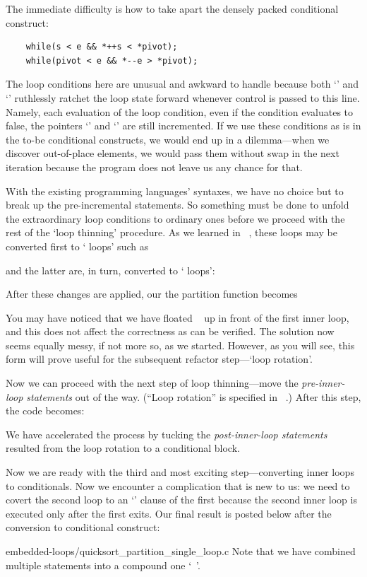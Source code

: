 The immediate difficulty is how to take apart the densely packed conditional construct:
\begin{lstlisting}
    while(s < e && *++s < *pivot);
    while(pivot < e && *--e > *pivot);
\end{lstlisting}
The loop conditions here are unusual and awkward to handle
because both `' and `' ruthlessly ratchet the loop state forward
whenever control is passed to this line.
Namely, each evaluation of the loop condition, even if the condition evaluates to false, the
pointers `' and `' are still incremented.
If we use these conditions as is in the to-be conditional constructs, we would end up in a
dilemma---when we discover out-of-place elements, we would pass them without swap in the next
iteration because the program does not leave us any chance for that.


With the existing programming languages' syntaxes, we have no choice but to break
up the pre-incremental statements.
So something must be done to unfold the extraordinary loop conditions to
ordinary ones before we proceed with the rest of the `loop thinning' procedure.
As we learned in ~, these loops may be converted first to
` loops' such as

and the latter are, in turn, converted to ` loops':

After these changes are applied, our the partition function becomes

You may have noticed that we have floated ~ up in front of the first inner loop,
and this does not affect the correctness as can be verified.
The solution now seems equally messy, if not more so, as we started.
However, as you will see, this form will prove useful for the subsequent refactor step---`loop
rotation'.


Now we can proceed with the next step
of loop thinning---move the \emph{pre-inner-loop statements} out of the way.
(``Loop rotation'' is specified in ~.)
After this step, the code becomes:

We have accelerated the process by tucking the \emph{post-inner-loop statements}
resulted from the loop rotation to a conditional block.


Now we are ready with the third and most exciting step---converting inner loops to conditionals.
Now we encounter a complication that is new to us: we need to covert the second loop to an
`' clause of the first because the second inner loop is executed only after the first
exits.
Our final result is posted below after the conversion to conditional construct:

{embedded-loops/quicksort_partition_single_loop.c}
Note that we have combined multiple statements into a compound one `~'.


